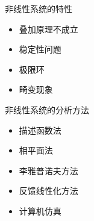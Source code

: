 \begin{frame}{非线性系统的特性}
\begin{block}{}
\begin{itemize}
\item 叠加原理不成立
\item 稳定性问题
\item 极限环
\item 畸变现象
\end{itemize}
\end{block}
\end{frame}

\begin{frame}{非线性系统的分析方法}
\begin{itemize}
\item 描述函数法
\item 相平面法
\item 李雅普诺夫方法
\item 反馈线性化方法
\item 计算机仿真
\end{itemize}
\end{frame}
